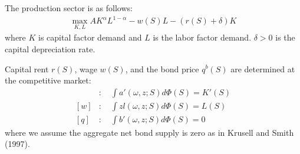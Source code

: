 The production sector is as follows:
\begin{align*}
  \max_{K,L} A K^{\alpha}L^{1-\alpha} - w(S)L - (r(S)+\delta)K
\end{align*}
where $K$ is capital factor demand and $L$ is the labor factor demand. $\delta>0$ is the capital depreciation rate.
 
Capital rent $r(S)$, wage $w(S)$, and the bond price $q^{b}(S)$ are determined at the competitive market:
\begin{align*}
  [r]&:\quad \int a'(\omega,z;S)d\Phi(S) = K'(S)
  \\
  [w]&:\quad \int z l(\omega,z;S) d\Phi(S) = L(S)
  \\
  [q]&:\quad \int b'(\omega,z;S) d\Phi(S) = 0
\end{align*}
where we assume the aggregate net bond supply is zero as in Krusell and Smith (1997).

\clearpage
